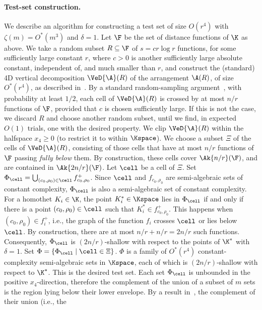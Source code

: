 \paragraph{Test-set construction.}
\fi
We describe an algorithm for constructing a test set 
of size $O(r^4)$ with $\zeta(m)=O^*(m^3)$ and $\delta=1$.
Let $\F$ be the set of distance functions of $\K$ as above. We take a 
random subset $R\subseteq \F$ of $s = cr\log r$ functions, for some sufficiently large constant $r$, 
where $c>0$ is another sufficiently large absolute constant, independent of, and much smaller than $r$, 
and construct the (standard) 4D
vertical decomposition $\VeD{\A}(R)$ of the arrangement $\A(R)$, of size $O^*(r^4)$, as 
described in~\cite{AES,Koltun-04a,SA}.
By a standard random-sampling argument~\cite{HW87}, with probability at least $1/2$, 
each cell of $\VeD{\A}(R)$ is crossed by at most $n/r$ functions of $\F$, 
provided that $c$ is chosen sufficiently large.
If this is not the case, we discard $R$ and choose another random subset, until we find, in
expected $O(1)$ trials, one with
the desired property. 
We clip $\VeD{\A}(R)$ within the halfspace $x_4\ge 0$ (to restrict it to within $\Kspace$).
We choose a subset $\Xi$ of the cells of $\VeD{\A}(R)$, consisting of those cells that have at most 
$n/r$ functions of $\F$ passing \emph{fully below} them. By construction, these cells cover 
$\Ak{n/r}(\F)$, and are contained in $\Ak{2n/r}(\F)$.
%
Let $\cell$ be a cell of $\Xi$.
Set $\Phi_\cell = \bigcup_{(c_0,\rho_0)\in\cell} f_{c_0,\rho_0}^+$.
Since $\cell$ and $f_{c_0,\rho_0}$ are semi-algebraic sets of constant complexity, 
$\Phi_\cell$ is also a semi-algebraic set of constant complexity. 
For a homothet $K_i\in \K$, the point $K_i^* \in \Kspace$ lies in $\Phi_\cell$ if and only 
if there is a point $(c_0,\rho_0)\in\cell$ such that $K_i^* \in f_{c_0,\rho_0}^+$. This happens
when $(c_0,\rho_0)\in f_i^+$, i.e., the graph of 
the function $f_i$ crosses $\cell$ or lies below $\cell$.
By construction, there are at most $n/r + n/r = 2n/r$ such functions. 
Consequently, $\Phi_\cell$ is $(2n/r)$-shallow with respect to the points of $\K^*$ with
$\delta = 1$.
%
Set $\Phi = \{\Phi_\cell \mid \cell \in \Xi\}$.
$\Phi$ is a family of $O^*(r^4)$ constant-complexity semi-algebraic 
sets
in $\Kspace$, each of which is $(2n/r)$-shallow with respect to $\K^*$. This is the desired test set.
Each set $\Phi_\cell$ is unbounded in the positive $x_4$-direction, therefore the 
complement of the union of a subset of $m$ sets is the region lying below their 
lower envelope. By a result in~\cite{AES:vd}, the complement of their union (i.e., the 
